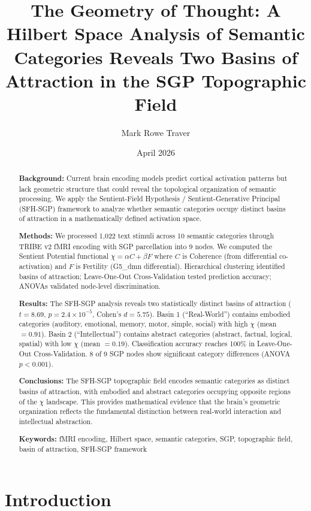 \documentclass[12pt]{article}
\title{The Geometry of Thought: A Hilbert Space Analysis of Semantic Categories Reveals Two Basins of Attraction in the SGP Topographic Field}
\author[1]{Mark Rowe Traver}
\affil[1]{Sentient-Field Braintrust, Rossmoor, CA}
\date{April 2026}
\numberwithin{equation}{section}
\begin{document}
\maketitle
\linenumbers

\begin{abstract}
	\textbf{Background:} Current brain encoding models predict cortical activation patterns but lack geometric structure that could reveal the topological organization of semantic processing. We apply the Sentient-Field Hypothesis / Sentient-Generative Principal (SFH-SGP) framework to analyze whether semantic categories occupy distinct basins of attraction in a mathematically defined activation space.

	\textbf{Methods:} We processed 1,022 text stimuli across 10 semantic categories through TRIBE v2 fMRI encoding with SGP parcellation into 9 nodes. We computed the Sentient Potential functional $\chi = \alpha C + \beta F$ where $C$ is Coherence (from differential co-activation) and $F$ is Fertility (G5\_dmn differential). Hierarchical clustering identified basins of attraction; Leave-One-Out Cross-Validation tested prediction accuracy; ANOVAs validated node-level discrimination.

	\textbf{Results:} The SFH-SGP analysis reveals two statistically distinct basins of attraction ($t=8.69$, $p=2.4\times10^{-5}$, Cohen's $d=5.75$). Basin 1 (``Real-World'') contains embodied categories (auditory, emotional, memory, motor, simple, social) with high $\chi$ (mean $=0.91$). Basin 2 (``Intellectual'') contains abstract categories (abstract, factual, logical, spatial) with low $\chi$ (mean $=0.19$). Classification accuracy reaches 100\% in Leave-One-Out Cross-Validation. 8 of 9 SGP nodes show significant category differences (ANOVA $p<0.001$).

	\textbf{Conclusions:} The SFH-SGP topographic field encodes semantic categories as distinct basins of attraction, with embodied and abstract categories occupying opposite regions of the $\chi$ landscape. This provides mathematical evidence that the brain's geometric organization reflects the fundamental distinction between real-world interaction and intellectual abstraction.

	\textbf{Keywords:} fMRI encoding, Hilbert space, semantic categories, SGP, topographic field, basin of attraction, SFH-SGP framework
\end{abstract}

\section{Introduction}
\end{document}
